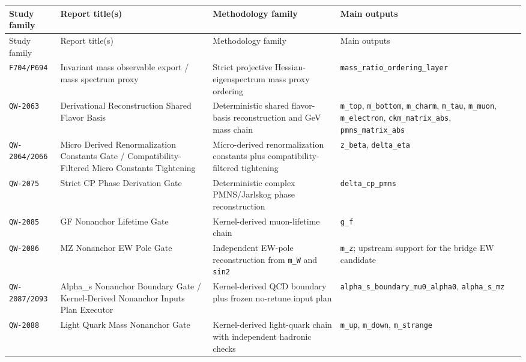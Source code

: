 \newcommand{\dimlessunit}{\shortstack[l]{\texttt{dimension-}\\\texttt{less}}}
\small
\begin{longtable}{@{}p{1.9cm}p{4.0cm}p{5.0cm}p{4.1cm}@{}}
\toprule
Study family & Report title(s) & Methodology family & Main outputs \\
\midrule
\endfirsthead
\toprule
Study family & Report title(s) & Methodology family & Main outputs \\
\midrule
\endhead
\texttt{F704/P694} &
Invariant mass observable export / mass spectrum proxy &
Strict projective Hessian-eigenspectrum mass proxy ordering &
\texttt{mass\_ratio\_ordering\_layer} \\

\texttt{QW-2063} &
Derivational Reconstruction Shared Flavor Basis &
Deterministic shared flavor-basis reconstruction and GeV mass chain &
\texttt{m\_top}, \texttt{m\_bottom}, \texttt{m\_charm}, \texttt{m\_tau}, \texttt{m\_muon}, \texttt{m\_electron}, \texttt{ckm\_matrix\_abs}, \texttt{pmns\_matrix\_abs} \\

\texttt{QW-2064/2066} &
Micro Derived Renormalization Constants Gate / Compatibility-Filtered Micro Constants Tightening &
Micro-derived renormalization constants plus compatibility-filtered tightening &
\texttt{z\_beta}, \texttt{delta\_eta} \\

\texttt{QW-2075} &
Strict CP Phase Derivation Gate &
Deterministic complex PMNS/Jarlskog phase reconstruction &
\texttt{delta\_cp\_pmns} \\

\texttt{QW-2085} &
GF Nonanchor Lifetime Gate &
Kernel-derived muon-lifetime chain &
\texttt{g\_f} \\

\texttt{QW-2086} &
MZ Nonanchor EW Pole Gate &
Independent EW-pole reconstruction from \texttt{m\_W} and \texttt{sin2} &
\texttt{m\_z}; upstream support for the bridge EW candidate \\

\texttt{QW-2087/2093} &
Alpha\_s Nonanchor Boundary Gate / Kernel-Derived Nonanchor Inputs Plan Executor &
Kernel-derived QCD boundary plus frozen no-retune input plan &
\texttt{alpha\_s\_boundary\_mu0\_alpha0}, \texttt{alpha\_s\_mz} \\

\texttt{QW-2088} &
Light Quark Mass Nonanchor Gate &
Kernel-derived light-quark chain with independent hadronic checks &
\texttt{m\_up}, \texttt{m\_down}, \texttt{m\_strange} \\


\end{longtable}
